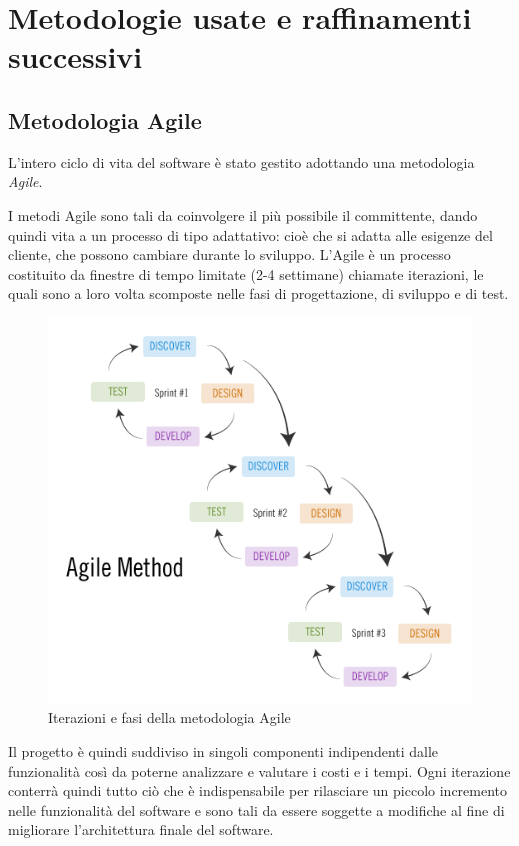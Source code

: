 \chapter{Metodologie usate e raffinamenti successivi}

\section{Metodologia Agile}

L'intero ciclo di vita del software è stato gestito adottando una metodologia \emph{Agile}.

I metodi Agile sono tali da coinvolgere il più possibile il committente, dando quindi vita a un processo di tipo adattativo: cioè che si adatta alle esigenze del cliente, che possono cambiare durante lo sviluppo.
L'Agile è un processo costituito da finestre di tempo limitate (2-4 settimane) chiamate iterazioni, le quali sono a loro volta scomposte nelle fasi di progettazione, di sviluppo e di test.

\begin{figure}[!htbp]
\centering
\includegraphics[scale=0.5]{immagini/agile.png}
\caption{Iterazioni e fasi della metodologia Agile}
\end{figure}

Il progetto è quindi suddiviso in singoli componenti indipendenti dalle funzionalità così da poterne analizzare e valutare i costi e i tempi. Ogni iterazione conterrà quindi tutto ciò che è indispensabile per rilasciare un piccolo incremento nelle funzionalità del software e sono tali da essere soggette a modifiche al fine di migliorare l'architettura finale del software.

